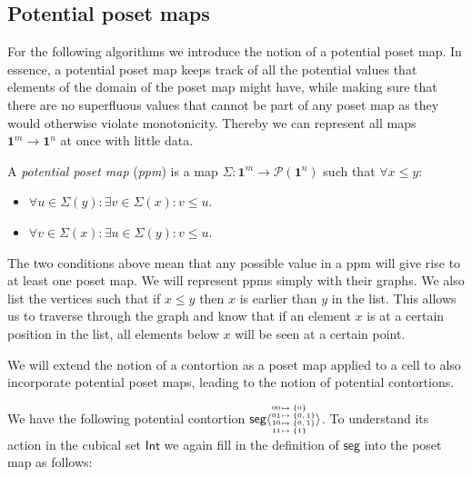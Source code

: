 \documentclass{llncs}
\newcommand{\continuation}{??}
\newenvironment{examplecontd}[1]
{\renewcommand{\continuation}{\ref{#1}}\expcont[continued]}
{\endexpcont}
\newcommand{\mname}[1]{\textit{{#1}}}
\newcommand{\pint}[1]{\mathbf{1}^{#1}}
\newcommand{\cont}[2]{\ensuremath{ \ifthenelse{\equal{#2}{}}{#1}{{#1}\langle{#2}\rangle}} }
\newcommand{\pow}[1]{\mathcal{P}({#1})}
\newcommand{\cset}[1]{\ensuremath{\mathsf{{#1}}}}
\newcommand{\substfour}[4]{\tiny
  \arraycolsep=.4pt\def\arraystretch{1}
  \begin{array}{ll}
    00 &\mapsto {#1} \\
    01 &\mapsto {#2} \\
    10 &\mapsto {#3} \\
    11 &\mapsto {#4} 
  \end{array}
}
\begin{document}
\begin{proposition}
\subsection{Potential poset maps}
\label{ssec:ppm}

For the following algorithms we introduce the notion of a potential poset map. In
essence, a potential poset map keeps track of all the potential values that elements of
the domain of the poset map might have, while making sure that there are no
superfluous values that cannot be part of any poset map as they would otherwise
violate monotonicity. Thereby we can represent all maps $\pint{m} \to \pint{n}$
at once with little data.

\begin{definition}

  A \mname{potential poset map} (\mname{ppm}) is a map $\Sigma : \pint{m} \to \pow{\pint{n}}$
  such that $\forall x \leq y$:
  \begin{itemize}
  \item $\forall u \in \Sigma(y) : \exists v \in \Sigma(x) : v \leq u$.
  \item $\forall v \in \Sigma(x) : \exists u \in \Sigma(y) : v \leq u$.
  \end{itemize}

\end{definition}

The two conditions above mean that any possible value in a ppm will give
rise to at least one poset map.
We will represent ppms simply with their graphs. We also
list the vertices such that if $x \leq y$ then $x$ is earlier than $y$ in the
list. This allows us to traverse through the graph and know that if an element
$x$ is at a certain position in the list, all elements below $x$ will be seen at
a certain point.

We will extend the notion of a contortion as a poset map applied to a cell to
also incorporate potential poset maps, leading to the notion of potential contortions.

\begin{examplecontd}{exp:int}
  We have the following potential contortion
  $\cont{\cset{seg}}{\substfour{\{0\}}{\{0, 1\}}{\{0, 1\}}{\{1\}}}$. To
  understand its action in the cubical set \cset{Int} we again fill in the
  definition of \cset{seg} into the poset map as follows:


\end{examplecontd}
\end{proposition}
\end{document}
